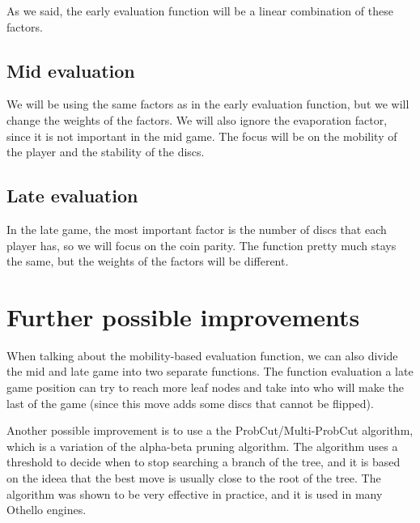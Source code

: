 \documentclass{article}
\begin{document}
As we said, the early evaluation function will be a linear combination of these factors.

\subsection*{Mid evaluation}

We will be using the same factors as in the early evaluation function, but we will change the weights of the factors.
We will also ignore the evaporation factor, since it is not important in the mid game.
The focus will be on the mobility of the player and the stability of the discs.

\subsection*{Late evaluation}

In the late game, the most important factor is the number of discs that each player has, so we will focus on the coin parity.
The function pretty much stays the same, but the weights of the factors will be different.

\section*{Further possible improvements}
\quad When talking about the mobility-based evaluation function, we can also divide the mid and late game into two separate functions. 
The function evaluation a late game position can try to reach more leaf nodes and take into who will make the last of the game (since this move adds some discs that cannot be flipped).

Another possible improvement is to use a the ProbCut/Multi-ProbCut algorithm, which is a variation of the alpha-beta pruning algorithm. 
The algorithm uses a threshold to decide when to stop searching a branch of the tree, and it is based on the ideea that the best move is usually close to the root of the tree.
The algorithm was shown to be very effective in practice, and it is used in many Othello engines. 
\end{document}
